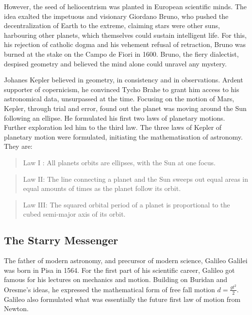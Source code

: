 However, the seed of heliocentrism was planted in European scientific minds. The idea exalted the impetuous and visionary Giordano Bruno, who pushed the decentralization of Earth to the extreme, claiming stars were other suns, harbouring other planets, which themselves could sustain intelligent life. For this, his rejection of catholic dogma and his vehement refusal of retraction, Bruno was burned at the stake on the Campo de Fiori in 1600. Bruno, the fiery dialectist, despised geometry and believed the mind alone could unravel any mystery. 

Johanes Kepler believed in geometry, in consistency and in observations. Ardent supporter of copernicism, he convinced Tycho Brahe to grant him access to his astronomical data, unsurpassed at the time. Focusing on the motion of Mars, Kepler, through trial and error, found out the planet was moving around the Sun following an ellipse. He formulated his first two laws of planetary motions. Further exploration led him to the third law. The three laws of Kepler of planetary motion were formulated, initiating the mathematisation of astronomy. They are:

\begin{quote}
Law I : All planets orbits are ellipses, with the Sun at one focus.
\end{quote}

\begin{quote}
Law II: The line connecting a planet and the Sun sweeps out equal areas in equal amounts of times as the planet follow its orbit.
\end{quote}
 
 \begin{quote}
 Law III: The squared orbital period of a planet is proportional to the cubed semi-major axis of its orbit.
 \end{quote}


\subsection*{The Starry Messenger}


The father of modern astronomy, and precursor of modern science, Galileo Galilei was born in Pisa in 1564. For the first part of his scientific career, Galileo got famous for his lectures on mechanics and motion. Building on Buridan and Oresme's ideas, he expressed the mathematical form of free fall motion $ d = \frac{gt^2}{2}$. Galileo also formulated what was essentially the future first law of motion from Newton.

